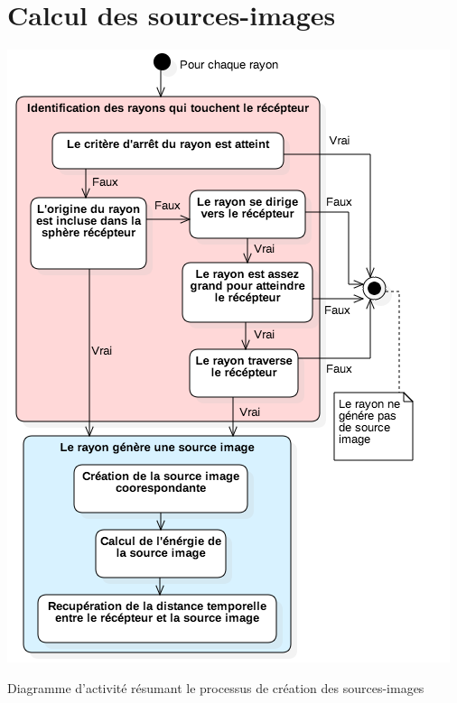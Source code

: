 \section{Calcul des sources-images} \label{sect_si}

\begin{figureth}
	\includegraphics[width=0.7\linewidth]{images/DiagSi}
	\caption{Diagramme d'activité résumant le processus de création des sources-images}
	\label{DiagSi}
\end{figureth}

